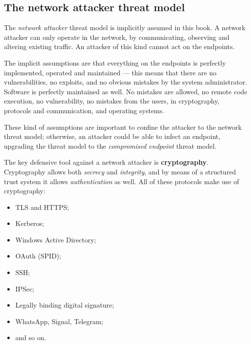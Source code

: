 \documentclass[10pt]{\classname}
\begin{document}
\subsection{The network attacker threat model}

The \emph{network attacker} threat model is implicitly assumed in this book. A
network attacker can only operate in the network, by communicating, observing
and altering existing traffic. An attacker of this kind cannot act on the
endpoints.

The implicit assumptions are that everything on the endpoints is perfectly
implemented, operated and maintained --- this means that there are no
vulnerabilities, no exploits, and no obvious mistakes by the system
administrator. Software is perfectly maintained as well. No mistakes are
allowed, no remote code execution, no vulnerability, no mistakes from the
users, in cryptography, protocols and communication, and operating systems.

These kind of assumptions are important to confine the attacker to the network
threat model; otherwise, an attacker could be able to infect an endpoint,
upgrading the threat model to the \emph{compromised endpoint} threat
model.

The key defensive tool against a network attacker is \textbf{cryptography}.
Cryptography allows both \emph{secrecy} and \emph{integrity}, and by means of a
structured trust system it allows \emph{authentication} as well. All of these
protocols make use of cryptography:
\begin{itemize}
    \item TLS and HTTPS;
    \item Kerberos;
    \item Windows Active Directory;
    \item OAuth (SPID);
    \item SSH;
    \item IPSec;
    \item Legally binding digital signature;
    \item WhatsApp, Signal, Telegram;
    \item and so on.
\end{itemize}
\end{document}
